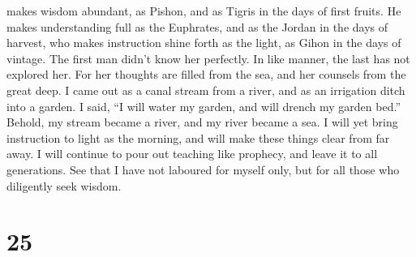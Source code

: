 makes wisdom abundant, as Pishon, and as Tigris in the days of first
fruits.  He makes understanding full as the Euphrates, and
as the Jordan in the days of harvest,  who makes
instruction shine forth as the light, as Gihon in the days of vintage.
 The first man didn't know her perfectly. In like manner,
the last has not explored her.  For her thoughts are filled
from the sea, and her counsels from the great deep.  I came
out as a canal stream from a river, and as an irrigation ditch into a
garden.  I said, ``I will water my garden, and will drench
my garden bed.'' Behold, my stream became a river, and my river became a
sea.  I will yet bring instruction to light as the morning,
and will make these things clear from far away.  I will
continue to pour out teaching like prophecy, and leave it to all
generations.  See that I have not laboured for myself only,
but for all those who diligently seek wisdom.

\hypertarget{section-21}{%
\section{25}\label{section-21}}

